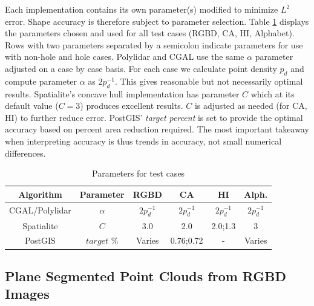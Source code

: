 Each implementation contains its own parameter(s) modified to minimize $L^2$ error. Shape accuracy is therefore subject to parameter selection. Table \ref{table:ch2_params} displays the parameters chosen and used for all test cases (RGBD, CA, HI, Alphabet). Rows with two parameters separated by a semicolon indicate parameters for use with non-hole and hole cases.  Polylidar and CGAL use the same $\alpha$ parameter adjusted on a case by case basis. For each case we calculate point density $p_d$ and compute parameter $\alpha$ as $2p^{-1}_d$.  This gives reasonable but not necessarily optimal results.  Spatialite's concave hull implementation has  parameter $C$ which at its default value ($C=3$) produces excellent results. $C$ is adjusted as needed (for CA, HI) to further reduce error.  PostGIS' \emph{target percent} is set to provide the optimal accuracy based on  percent area reduction required. The most important takeaway when interpreting accuracy is thus trends in accuracy, not small numerical differences.


\begin{table}[ht]
\centering
\caption{Parameters for test cases}
\label{table:ch2_params}
\begin{tabular}{@{}cccccc@{}}
\toprule
Algorithm      & Parameter     & RGBD &       CA          & HI  &  Alph.                  \\ \midrule
CGAL/Polylidar & $\alpha$           & $2p^{-1}_d$  &$2p^{-1}_d$ & $2p^{-1}_d$ & $2p^{-1}_d$   \\ \addlinespace[1mm]
Spatialite     & $C$                & 3.0  &            2.0           & 2.0;1.3 & 3           \\
\addlinespace[1mm]
PostGIS        & $target$ \%  & Varies     & 0.76;0.72   & -         & Varies  \\ \bottomrule
\end{tabular}
\end{table}


\subsection{Plane Segmented Point Clouds from RGBD Images}\label{sec:ch2_rgbd}

